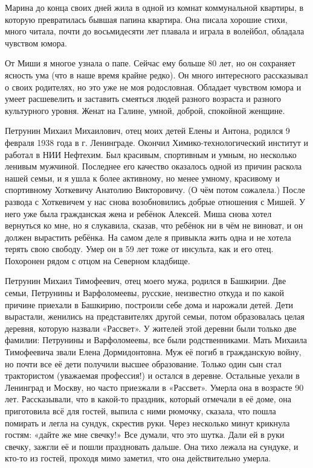 Марина до конца своих дней жила в одной из комнат коммунальной квартиры, в которую превратилась бывшая папина квартира.
Она писала хорошие стихи, много читала, почти до восьмидесяти лет плавала и играла в волейбол, обладала чувством юмора.

От Миши я многое узнала о папе.
Сейчас ему больше 80 лет, но он сохраняет ясность ума (что в наше время крайне редко).
Он много интересного рассказывал о своих родителях, но это уже не моя родословная.
Обладает чувством юмора и умеет расшевелить и заставить смеяться людей разного возраста и разного культурного уровня.
Женат на Галине, умной, доброй, спокойной женщине.

{\sloppy 
Петрунин Михаил Михаилович, отец моих детей  Елены и Антона, родился 9 февраля 1938 года в г.
Ленинграде.
Окончил Химико-технологический институт и работал в НИИ Нефтехим.
Был красивым, спортивным и умным, но несколько ленивым мужчиной.
Последнее его качество оказалось одной из причин раскола нашей семьи, и я ушла к более активному, но менее умному, красивому  и спортивному Хоткевичу Анатолию Викторовичу.
(О чём потом сожалела.)
После развода с Хоткевичем у нас снова возобновились добрые отношения с Мишей.
У него уже была гражданская жена и ребёнок Алексей.
Миша снова хотел вернуться ко мне, но я слукавила, сказав, что ребёнок ни в чём не виноват, и он должен вырастить ребёнка.
На самом деле я привыкла жить одна и не хотела терять свою свободу.
Умер он в 59 лет тоже от инсульта, как и его отец.
Похоронен рядом с отцом на Северном кладбище.

}

Петрунин Михаил Тимофеевич, отец моего мужа, родился в Башкирии.
Две семьи, Петрунины и Варфоломеевы, русские, неизвестно откуда и по какой причине приехали в Башкирию, построили себе дома и нарожали детей.
Дети вырастали,  женились на представителях другой семьи, потом образовалась целая деревня, которую назвали «Рассвет».
У жителей этой деревни были только две фамилии: Петрунины и Варфоломеевы, все были родственниками.
Мать Михаила Тимофеевича звали Елена Дормидонтовна.
Муж её погиб в гражданскую войну, но почти все её дети получили высшее образование.
Только один сын стал трактористом (уважаемая профессия!) и остался в деревне.
Остальные уехали в Ленинград и Москву, но часто приезжали в «Рассвет».
Умерла она в возрасте 90 лет.
Рассказывали, что в какой-то праздник, который отмечали в её доме, она приготовила всё для гостей, выпила с ними рюмочку, сказала, что пошла помирать и легла на сундук, скрестив руки.
Через несколько минут крикнула гостям: «дайте же мне свечку!»
Все думали, что это шутка.
Дали ей в руки свечку, зажгли её и пошли праздновать дальше.
Она тихо лежала на сундуке, и кто-то из гостей, проходя мимо заметил, что она действительно умерла.


